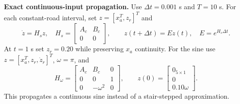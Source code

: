 \textbf{Exact continuous-input propagation.} Use $\Delta t=0.001$ s and $T=10$ s.
For each constant-road interval, set $z=[x_a^T,z_r]^T$ and
\begin{equation}
 \dot z=H_sz,\quad H_s=\begin{bmatrix}A_c&B_c\\0&0\end{bmatrix},\qquad
 z(t+\Delta t)=E z(t),\quad E=e^{H_s\Delta t}.
\end{equation}
At $t=1$ s set $z_r=0.20$ while preserving $x_a$ continuity. For the sine use
$z=[x_a^T,z_r,\dot z_r]^T$, $\omega=\pi$, and
\begin{equation}
 H_\omega=\begin{bmatrix}A_c&B_c&0\\0&0&1\\0&-\omega^2&0\end{bmatrix},\qquad
 z(0)=\begin{bmatrix}0_{5\times1}\\0\\0.10\omega\end{bmatrix}.
\end{equation}
This propagates a continuous sine instead of a stair-stepped approximation.

